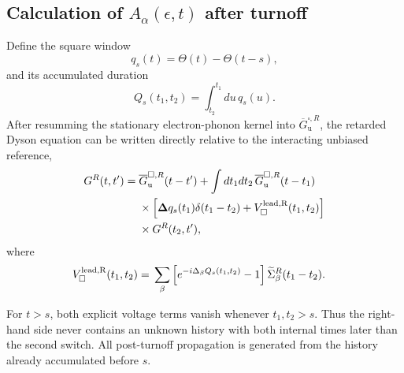 \documentclass[
 reprint,
 superscriptaddress,
 amsmath,amssymb,
 aps,prb,
 longbibliography,
 floatfix
]{revtex4-2}
\begin{document}
\subsection{Calculation of $A_\alpha(\epsilon,t)$ after turnoff}
\label{sec:square-A}

Define the square window
\begin{equation*}
q_s(t)
=
\Theta(t)-\Theta(t-s),
\end{equation*}
and its accumulated duration
\begin{equation*}
Q_s(t_1,t_2)
=
\int_{t_2}^{t_1}du\,
q_s(u).
\end{equation*}
After resumming the stationary electron-phonon kernel into $\overline G_{\mathrm u}^{\square,R}$, the retarded Dyson equation can be written directly relative to the interacting unbiased reference,
\begin{equation*}
\begin{aligned}
G^R(t,t')
={}&
\overline G_{\mathrm u}^{\square,R}(t-t')
+
\int dt_1dt_2\,
\overline G_{\mathrm u}^{\square,R}(t-t_1)
\\
&\times
\Big[
\bm\Delta q_s(t_1)
\delta(t_1-t_2)
+
V_\square^{\rm lead,R}(t_1,t_2)
\Big]
\\
&\times
G^R(t_2,t'),
\end{aligned}
\end{equation*}
where
\begin{equation*}
\begin{aligned}
V_\square^{\rm lead,R}(t_1,t_2)
={}&
\sum_\beta
\left[
e^{-i\Delta_\beta Q_s(t_1,t_2)}
-1
\right]
\widetilde\Sigma_\beta^R(t_1-t_2).
\end{aligned}
\end{equation*}

For $t>s$, both explicit voltage terms vanish whenever $t_1,t_2>s$. Thus the right-hand side never contains an unknown history with both internal times later than the second switch. All post-turnoff propagation is generated from the history already accumulated before $s$. 
\end{document}
